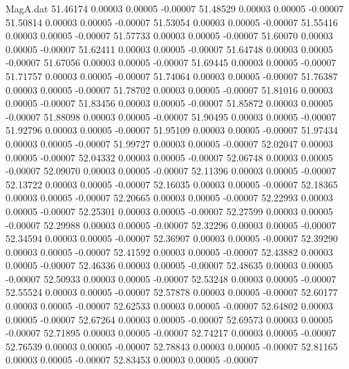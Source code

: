 \begin{filecontents}{MagA.dat}
  51.46174    0.00003    0.00005   -0.00007
  51.48529    0.00003    0.00005   -0.00007
  51.50814    0.00003    0.00005   -0.00007
  51.53054    0.00003    0.00005   -0.00007
  51.55416    0.00003    0.00005   -0.00007
  51.57733    0.00003    0.00005   -0.00007
  51.60070    0.00003    0.00005   -0.00007
  51.62411    0.00003    0.00005   -0.00007
  51.64748    0.00003    0.00005   -0.00007
  51.67056    0.00003    0.00005   -0.00007
  51.69445    0.00003    0.00005   -0.00007
  51.71757    0.00003    0.00005   -0.00007
  51.74064    0.00003    0.00005   -0.00007
  51.76387    0.00003    0.00005   -0.00007
  51.78702    0.00003    0.00005   -0.00007
  51.81016    0.00003    0.00005   -0.00007
  51.83456    0.00003    0.00005   -0.00007
  51.85872    0.00003    0.00005   -0.00007
  51.88098    0.00003    0.00005   -0.00007
  51.90495    0.00003    0.00005   -0.00007
  51.92796    0.00003    0.00005   -0.00007
  51.95109    0.00003    0.00005   -0.00007
  51.97434    0.00003    0.00005   -0.00007
  51.99727    0.00003    0.00005   -0.00007
  52.02047    0.00003    0.00005   -0.00007
  52.04332    0.00003    0.00005   -0.00007
  52.06748    0.00003    0.00005   -0.00007
  52.09070    0.00003    0.00005   -0.00007
  52.11396    0.00003    0.00005   -0.00007
  52.13722    0.00003    0.00005   -0.00007
  52.16035    0.00003    0.00005   -0.00007
  52.18365    0.00003    0.00005   -0.00007
  52.20665    0.00003    0.00005   -0.00007
  52.22993    0.00003    0.00005   -0.00007
  52.25301    0.00003    0.00005   -0.00007
  52.27599    0.00003    0.00005   -0.00007
  52.29988    0.00003    0.00005   -0.00007
  52.32296    0.00003    0.00005   -0.00007
  52.34594    0.00003    0.00005   -0.00007
  52.36907    0.00003    0.00005   -0.00007
  52.39290    0.00003    0.00005   -0.00007
  52.41592    0.00003    0.00005   -0.00007
  52.43882    0.00003    0.00005   -0.00007
  52.46336    0.00003    0.00005   -0.00007
  52.48635    0.00003    0.00005   -0.00007
  52.50933    0.00003    0.00005   -0.00007
  52.53248    0.00003    0.00005   -0.00007
  52.55524    0.00003    0.00005   -0.00007
  52.57878    0.00003    0.00005   -0.00007
  52.60177    0.00003    0.00005   -0.00007
  52.62533    0.00003    0.00005   -0.00007
  52.64802    0.00003    0.00005   -0.00007
  52.67264    0.00003    0.00005   -0.00007
  52.69573    0.00003    0.00005   -0.00007
  52.71895    0.00003    0.00005   -0.00007
  52.74217    0.00003    0.00005   -0.00007
  52.76539    0.00003    0.00005   -0.00007
  52.78843    0.00003    0.00005   -0.00007
  52.81165    0.00003    0.00005   -0.00007
  52.83453    0.00003    0.00005   -0.00007

\end{filecontents}
